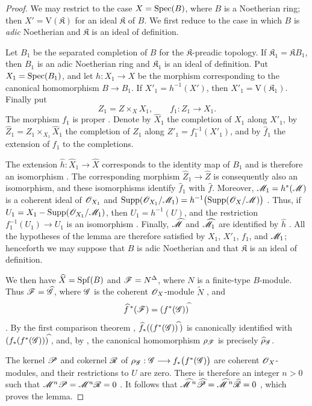 \begin{proof}
We may restrict to the case $X=\operatorname{Spec}(B)$, where $B$ is a
Noetherian ring; then $X'=\mathrm{V}(\mathfrak{K})$ for an ideal
$\mathfrak{K}$ of $B$.  We first reduce to the case in which $B$ is
\emph{adic} Noetherian and $\mathfrak{K}$ is an ideal of definition.

Let $B_1$ be the separated completion of $B$ for the
$\mathfrak{K}$-preadic topology.
If $\mathfrak{K}_1=\mathfrak{K}B_1$, then $B_1$ is an adic
Noetherian ring and $\mathfrak{K}_1$ is an ideal of definition.
Put $X_1=\operatorname{Spec}(B_1)$, and let $h:X_1\to X$ be the morphism
corresponding to the canonical homomorphism $B\to B_1$.  If
$X'_1=h^{-1}(X')$, then $X'_1=\mathrm{V}(\mathfrak{K}_1)$.  Finally
put
\[
  Z_1=Z\times_X X_1,\qquad f_1:Z_1\longrightarrow X_1.
\]
The morphism $f_1$ is proper .  Denote by
$\widehat{X}_1$ the completion of $X_1$ along $X'_1$, by $\widehat{Z}_1=
Z_1\times_{X_1}\widehat{X}_1$
the completion of $Z_1$ along
$Z'_1=f_1^{-1}(X'_1)$, and by
$\widehat{f}_1$ the extension of $f_1$ to the completions.

The extension
$\widehat{h}:\widehat{X}_1\to\widehat{X}$ corresponds to the
identity map of $B_1$ and is therefore an isomorphism
.  The corresponding morphism
$\widehat{Z}_1\to\widehat{Z}$ is consequently also an isomorphism,
and these isomorphisms identify $\widehat{f}_1$ with
$\widehat{f}$.  Moreover,
$\mathscr{M}_1=h^*(\mathscr{M})$ is a coherent ideal of $\mathscr{O}_{X_1}$ and $\operatorname{Supp}(\mathscr{O}_{X_1}/\mathscr{M}_1)
=h^{-1}\bigl(\operatorname{Supp}(\mathscr{O}_X/\mathscr{M})\bigr)$
.  Thus, if
$U_1=X_1-\operatorname{Supp}(\mathscr{O}_{X_1}/\mathscr{M}_1)$, then
$U_1=h^{-1}(U)$, and the restriction
$f_1^{-1}(U_1)\to U_1$ is an isomorphism
.  Finally, $\widehat{\mathscr{M}}$ and
$\widehat{\mathscr{M}}_1$ are identified by $\widehat{h}$
.  All the hypotheses of the lemma are therefore
satisfied by $X_1$, $X'_1$, $f_1$, and $\mathscr{M}_1$; henceforth we
may suppose that $B$ is adic Noetherian and that $\mathfrak{K}$ is
an ideal of definition.

We then have $\widehat{X}=\operatorname{Spf}(B)$ and
$\mathscr{F}=N^\Delta$, where $N$ is a finite-type $B$-module.  Thus
$\mathscr{F}=\widehat{\mathscr{G}}$, where $\mathscr{G}$ is the coherent
$\mathscr{O}_X$-module $\widetilde{N}$ , and
\[
  \widehat{f}^{\,*}(\mathscr{F})
  =(f^*(\mathscr{G}))^{\widehat{\,}}
\]
.  By the first comparison theorem
,
$\widehat{f}_*((f^*(\mathscr{G}))^{\widehat{\,}})$ is canonically identified with
$(f_*(f^*(\mathscr{G})))^{\widehat{\,}}$,
and, by , the canonical homomorphism
$\rho_{\mathscr{F}}$ is precisely $\widehat{\rho}_{\mathscr{G}}$.

The kernel $\mathscr{P}$ and cokernel $\mathscr{R}$ of $\rho_{\mathscr{G}}:
\mathscr{G}\longrightarrow f_*\bigl(f^*(\mathscr{G})\bigr)$
are coherent $\mathscr{O}_X$-modules, and their restrictions to $U$ are
zero.  There is therefore an integer $n>0$ such that $\mathscr{M}^n\mathscr{P}=\mathscr{M}^n\mathscr{R}=0$
.  It follows that $\widehat{\mathscr{M}}^{\,n}\widehat{\mathscr{P}}
=
\widehat{\mathscr{M}}^{\,n}\widehat{\mathscr{R}}
=0$
 , which proves the lemma.
\end{proof}

